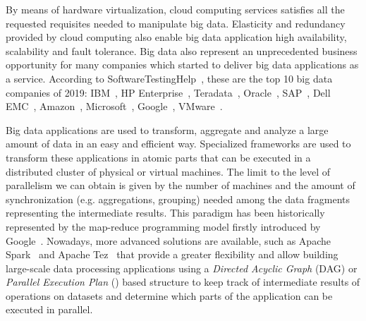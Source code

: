 By means of hardware virtualization, cloud computing services satisfies all the requested requisites needed to manipulate big data. Elasticity and redundancy provided by cloud computing also enable big data application high availability, scalability and fault tolerance.
Big data also represent an unprecedented business opportunity for many companies which started to deliver big data applications as a service. According to SoftwareTestingHelp~\cite{misc:BigDataCompanies}, these are the top 10 big data companies of 2019: IBM~\cite{misc:IBM}, HP Enterprise~\cite{misc:HPE}, Teradata~\cite{misc:Teradata}, Oracle~\cite{misc:Oracle}, SAP~\cite{misc:SAP}, Dell EMC~\cite{misc:EMC}, Amazon~\cite{misc:AWS}, Microsoft~\cite{misc:Microsoft}, Google~\cite{misc:Google}, VMware~\cite{misc:VMware}.

Big data applications are used to transform, aggregate and analyze a large amount of data in an easy and efficient way. Specialized frameworks are used to transform these applications in atomic parts that can be executed in a distributed cluster of physical or virtual machines. The limit to the level of parallelism we can obtain is given by the number of machines and the amount of synchronization (e.g. aggregations, grouping) needed among the data fragments representing the intermediate results. This paradigm has been historically represented by the map-reduce programming model firstly introduced by Google~\cite{misc:GoogleMapReduce}. Nowadays, more advanced solutions are available, such as Apache Spark~\cite{misc:ApacheSpark} and Apache Tez~\cite{misc:ApacheTez} that provide a greater flexibility and allow building large-scale data processing applications using a \textit{Directed Acyclic Graph} (DAG) or \textit{Parallel Execution Plan} (\plan) based structure to keep track of intermediate results of operations on datasets and determine which parts of the application can be executed in parallel.

